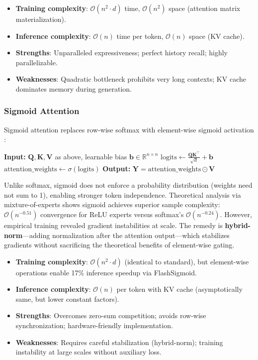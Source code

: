 \documentclass[11pt,a4paper]{article}
\begin{document}
\begin{itemize}[leftmargin=*]
    \item \textbf{Training complexity}: $\mathcal{O}(n^2 \cdot d)$ time, $\mathcal{O}(n^2)$ space (attention matrix materialization).
    \item \textbf{Inference complexity}: $\mathcal{O}(n)$ time per token, $\mathcal{O}(n)$ space (KV cache).
    \item \textbf{Strengths}: Unparalleled expressiveness; perfect history recall; highly parallelizable.
    \item \textbf{Weaknesses}: Quadratic bottleneck prohibits very long contexts; KV cache dominates memory during generation.
\end{itemize}

\subsubsection{Sigmoid Attention}
Sigmoid attention replaces row-wise softmax with element-wise sigmoid activation \citep{ramapuram_theory_2024}:

\begin{algorithmic}[1]
\State \textbf{Input:} $\mathbf{Q}, \mathbf{K}, \mathbf{V}$ as above, learnable bias $\mathbf{b} \in \mathbb{R}^{n \times n}$
\State $\text{logits} \gets \frac{\mathbf{Q}\mathbf{K}^\top}{\sqrt{d}} + \mathbf{b}$
\State $\text{attention\_weights} \gets \sigma(\text{logits})$ 
\State \textbf{Output:} $\mathbf{Y} = \text{attention\_weights} \odot \mathbf{V}$
\end{algorithmic}

Unlike softmax, sigmoid does not enforce a probability distribution (weights need not sum to 1), enabling stronger token independence. Theoretical analysis via mixture-of-experts shows sigmoid achieves superior sample complexity: $\mathcal{O}(n^{-0.51})$ convergence for ReLU experts versus softmax's $\mathcal{O}(n^{-0.24})$. However, empirical training revealed gradient instabilities at scale. The remedy is \textbf{hybrid-norm}---adding normalization after the attention output---which stabilizes gradients without sacrificing the theoretical benefits of element-wise gating.

\begin{itemize}[leftmargin=*]
    \item \textbf{Training complexity}: $\mathcal{O}(n^2 \cdot d)$ (identical to standard), but element-wise operations enable 17\% inference speedup via FlashSigmoid.
    \item \textbf{Inference complexity}: $\mathcal{O}(n)$ per token with KV cache (asymptotically same, but lower constant factors).
    \item \textbf{Strengths}: Overcomes zero-sum competition; avoids row-wise synchronization; hardware-friendly implementation.
    \item \textbf{Weaknesses}: Requires careful stabilization (hybrid-norm); training instability at large scales without auxiliary loss.
\end{itemize}
\end{document}

